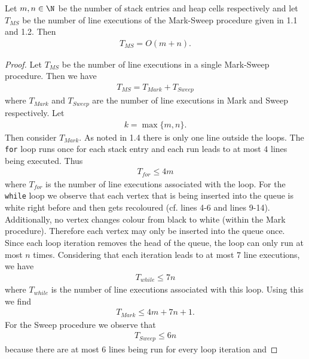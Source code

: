 \documentclass{article}
\begin{document}
\begin{claim}
    Let $m,n\in\N$ be the number of stack entries and heap cells respectively and
    let $T_{MS}$ be the number of line executions of the Mark-Sweep procedure
    given in 1.1 and 1.2. Then
    \begin{align*}
        T_{MS} = O(m+n).
    \end{align*} 
\end{claim}
\begin{proof}
    Let $T_{MS}$ be the number of line executions in a single Mark-Sweep procedure.
    Then we have
    \begin{align}
        \label{forlms}
        T_{MS} = T_{Mark} + T_{Sweep}
    \end{align}
    where $T_{Mark}$ and $T_{Sweep}$ are the number of line executions in Mark and
    Sweep respectively. Let
    \begin{align*}
        k = \max\{m,n\}.    
    \end{align*}
    Then consider $T_{Mark}$. As noted in 
    1.4 there is only one line outside the loops. The \texttt{for} loop runs once for each
    stack entry and each run leads to at most $4$ lines being executed. Thus
    \begin{align*}
        T_{for} \leq 4m
    \end{align*}
    where $T_{for}$ is the number of line executions associated with the loop. For
    the \texttt{while} loop we observe that each vertex that is being inserted into the
    queue is white right before and then gets recoloured (cf. lines 4-6 and lines 9-14).
    Additionally, no vertex changes colour from black to white (within the Mark procedure).
    Therefore each vertex may only be inserted into the queue once. Since each loop iteration 
    removes the head of the queue, the loop can only run at most $n$ times.
    Considering that each iteration leads to at most $7$ line executions, we have
    \begin{align*}
        T_{while} \leq 7n
    \end{align*}
    where $T_{while}$ is the number of line executions associated with this loop.
    Using this we find
    \begin{align*}
        T_{Mark} \leq 4m + 7n + 1.
    \end{align*}
     For the Sweep procedure we observe that
    \begin{align*}
        T_{Sweep} \leq 6n
    \end{align*}
    because there are at most $6$ lines being run for every loop iteration and

\end{proof}
\end{document}
